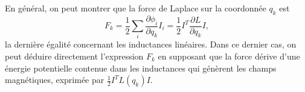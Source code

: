 


En général, on peut montrer que la force de Laplace sur la coordonnée $q_k$ est 
\begin{equation}
F_k=\frac{1}{2}\sum_i \frac{\partial \phi_i}{\partial q_k}  I_i = \frac{1}{2} I^T \frac{\partial L}{\partial q_k} I,
\label{eq:Lorentz}
\end{equation}
la dernière égalité concernant les inductances linéaires. Dans ce dernier cas, on peut déduire directement l'expression $F_k$  en supposant que la force dérive d'une énergie potentielle contenue dans les inductances qui génèrent les champs magnétiques, exprimée par $\frac{1}{2} I^T L(q_k) I$.




